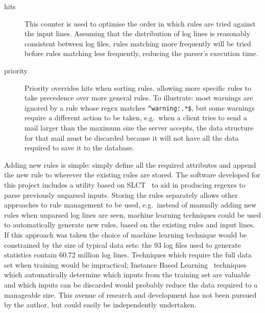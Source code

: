 \documentclass[draft]{svmult}
\newcommand{\numberOFlogFILES}[0]{%
    93%
}
\newcommand{\numberOFlogLINEShuman}[0]{%
    60.72 million%
}
\begin{document}
\begin{description}
    \item [hits] This counter is used to optimise the order in which rules
        are tried against the input lines.  Assuming that the distribution
        of log lines is reasonably consistent between log files, rules
        matching more frequently will be tried before rules matching less
        frequently, reducing the parser's execution time.

    \item [priority] Priority overrides hits when sorting rules, allowing
        more specific rules to take precedence over more general rules.  To
        illustrate: most warnings are ignored by a rule whose regex matches
        \verb!^warning:.*$!, but some warnings require a different action
        to be taken, e.g.\ when a client tries to send a mail larger than
        the maximum size the server accepts, the data structure for that
        mail must be discarded because it will not have all the data
        required to save it to the database.

\end{description}

Adding new rules is simple: simply define all the required attributes and
append the new rule to wherever the existing rules are stored.  The
software developed for this project includes a utility based on
SLCT~\cite{slct-paper} to aid in producing regexes to parse previously
unparsed inputs.  Storing the rules separately allows other approaches to
rule management to be used, e.g.\ instead of manually adding new rules when
unparsed log lines are seen, machine learning techniques could be used to
automatically generate new rules, based on the existing rules and input
lines.  If this approach was taken the choice of machine learning technique
would be constrained by the size of typical data sets: the
\numberOFlogFILES{} log files used to generate statistics contain
\numberOFlogLINEShuman{} log lines.  Techniques which require the full data
set when training would be impractical; Instance Based
Learning~\cite{instance-based-learning} techniques which automatically
determine which inputs from the training set are valuable and which inputs
can be discarded would probably reduce the data required to a manageable
size.  This avenue of research and development has not been pursued by the
author, but could easily be independently undertaken.

\label{overlapping rules}
\end{document}
